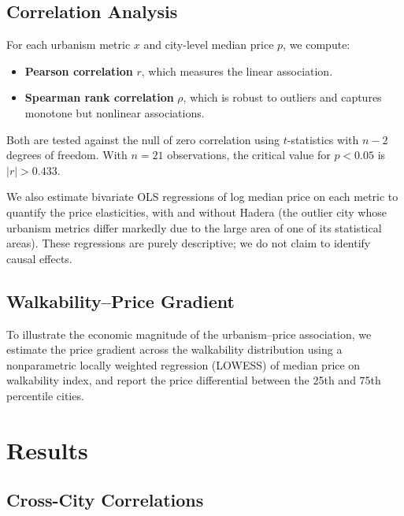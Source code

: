 \documentclass[12pt,a4paper]{article}
\begin{document}
\subsection{Correlation Analysis}
\label{sec:method_corr}

For each urbanism metric $x$ and city-level median price $p$, we compute:
\begin{itemize}
  \item \textbf{Pearson correlation} $r$, which measures the linear association.
  \item \textbf{Spearman rank correlation} $\rho$, which is robust to outliers
    and captures monotone but nonlinear associations.
\end{itemize}
Both are tested against the null of zero correlation using $t$-statistics with
$n-2$ degrees of freedom.  With $n=21$ observations, the critical value for
$p<0.05$ is $|r|>0.433$.

We also estimate bivariate OLS regressions of log median price on each metric
to quantify the price elasticities, with and without Hadera (the outlier city
whose urbanism metrics differ markedly due to the large area of one of its
statistical areas).  These regressions are purely descriptive; we do not claim
to identify causal effects.

\subsection{Walkability–Price Gradient}
\label{sec:method_grad}

To illustrate the economic magnitude of the urbanism–price association, we
estimate the price gradient across the walkability distribution using a
nonparametric locally weighted regression (LOWESS) of median price on walkability
index, and report the price differential between the 25th and 75th percentile
cities.

\section{Results}
\label{sec:results}

\subsection{Cross-City Correlations}
\label{sec:results_corr}
\end{document}
